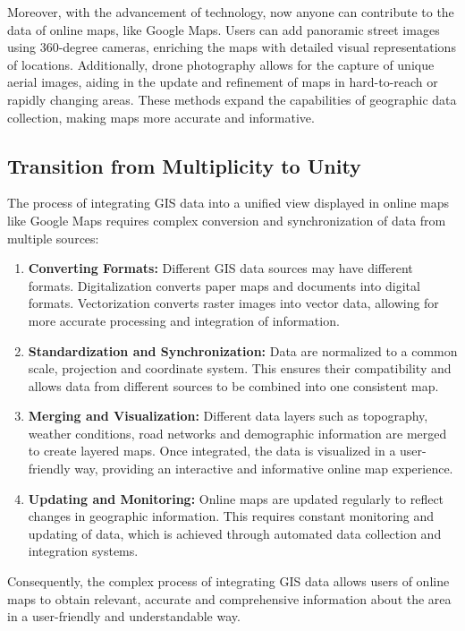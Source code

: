 \documentclass[10pt,oneside,english,a4paper]{article}
\begin{document}
Moreover, with the advancement of technology, now anyone can contribute to the data of online maps, like Google Maps. Users can add panoramic street images using 360-degree cameras, enriching the maps with detailed visual representations of locations. Additionally, drone photography allows for the capture of unique aerial images, aiding in the update and refinement of maps in hard-to-reach or rapidly changing areas. These methods expand the capabilities of geographic data collection, making maps more accurate and informative.

\subsection {Transition from Multiplicity to Unity} \label{data:integrating}
The process of integrating GIS data into a unified view displayed in online maps like Google Maps requires complex conversion and synchronization of data from multiple sources:

\begin{enumerate}
\item \textbf{Converting Formats:} Different GIS data sources may have different formats. Digitalization converts paper maps and documents into digital formats. Vectorization converts raster images into vector data, allowing for more accurate processing and integration of information.

\item \textbf{Standardization and Synchronization:} Data are normalized to a common scale, projection and coordinate system. This ensures their compatibility and allows data from different sources to be combined into one consistent map.

\item \textbf{Merging and Visualization:} Different data layers such as topography, weather conditions, road networks and demographic information are merged to create layered maps. Once integrated, the data is visualized in a user-friendly way, providing an interactive and informative online map experience.

\item \textbf{Updating and Monitoring:} Online maps are updated regularly to reflect changes in geographic information. This requires constant monitoring and updating of data, which is achieved through automated data collection and integration systems.
\end{enumerate}

Consequently, the complex process of integrating GIS data allows users of online maps to obtain relevant, accurate and comprehensive information about the area in a user-friendly and understandable way.
\end{document}
